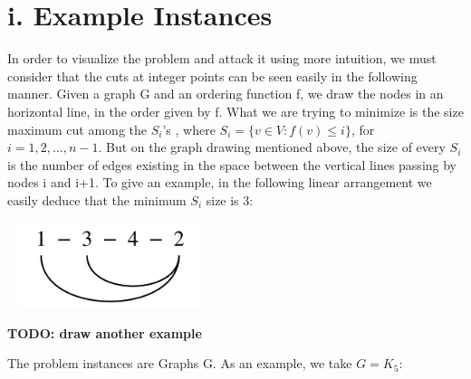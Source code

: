 \section*{i. Example Instances}


In order to visualize the problem and attack it using more intuition, we must consider that the cuts at integer points can 
be seen easily in the following manner. Given a graph G and an ordering function f, we draw the nodes in an horizontal line, in the order given by f. What we are trying to minimize is the size maximum cut among the $S_i$'s , where $S_i=\{v \in V : f(v) \leq i\}$, for $i=1,2,\ldots,n-1$. But on the graph drawing mentioned above, the size of every $S_i$ is the number of edges existing in the space between the vertical lines passing by nodes i and i+1. To give an example, in the following linear
arrangement we easily deduce that the minimum $S_i$ size is 3:


\begin{center}
\includegraphics[height=2.5cm,width=6cm]{img/graph2.png}
\end{center}

\textbf{TODO: draw another example}

The problem instances are Graphs G. As an example, we take $G=K_5$:


